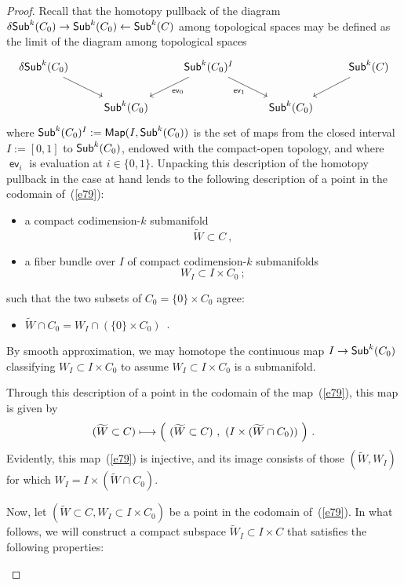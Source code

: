 \documentclass[10pt,a4paper]{amsart}
\DeclareMathOperator{\Map}{\sf Map}
\DeclareMathOperator{\Sub}{\sf Sub}
\DeclareMathOperator{\dSub}{\delta{\sf Sub}}
\DeclareMathOperator{\ev}{\mathsf{ev}}
\newcommand{\la}{\leftarrow}
\newcommand{\ra}{\rightarrow}
\newcommand{\w}{\widetilde}
\begin{document}
\begin{proof}
Recall that the homotopy pullback of the diagram $\dSub^k(C_0)\ra \Sub^k(C_0) \la \Sub^k(C)$ among topological spaces may be defined as the limit of the diagram among topological spaces
\[\begin{tikzcd}
	\dSub^k(C_0) && {\Sub^k(C_0)^I} && \Sub^k(C) \\
	& \Sub^k(C_0) && \Sub^k(C_0)
	\arrow[""', from=1-1, to=2-2]
	\arrow["{\ev_0}", from=1-3, to=2-2]
	\arrow["{\ev_1}"', from=1-3, to=2-4]
	\arrow["", from=1-5, to=2-4]
\end{tikzcd}\]
where $\Sub^k(C_0)^I := \Map(I,\Sub^k(C_0))$ is the set of maps from the closed interval $I := [0,1]$ to $\Sub^k(C_0)$, endowed with the compact-open topology, and where $\ev_i$ is evaluation at $i\in \{0,1\}$.
Unpacking this description of the homotopy pullback in the case at hand lends to the following description of a point in the codomain of~(\ref{e79}):
\begin{itemize}
    \item[+] a compact codimension-$k$ submanifold
    \[
    \w{W} \subset C
    ~,
    \]
    
    \item[+] a fiber bundle over $I$ of compact codimension-$k$ submanifolds 
    \[
    W_I \subset I \times C_0
    ~;
    \]

    
\end{itemize}
such that the two subsets of $C_0 = \{0\} \times C_0$ agree:
\begin{itemize}
    \item[-] $\w{W} \cap C_0 = W_I \cap (\{0\} \times C_0)$~.
\end{itemize}
By smooth approximation, we may homotope the continuous map $I \to \Sub^k(C_0)$ classifying $W_I \subset I \times C_0$ to assume $W_I \subset I \times C_0$ is a submanifold.  

Through this description of a point in the codomain of the map~(\ref{e79}), this map is given by 
\[
(\w{W} \subset C)
\longmapsto 
\Bigl( ~(\w{W} \subset C)~,~(I \times (\w{W} \cap C_0))~ \Bigr)
~.
\]
Evidently, this map~(\ref{e79}) is injective, and its image consists of those $(\w{W},W_I)$ for which $W_I = I \times (\w{W} \cap C_0)$.



Now, let $(\w{W} \subset C , W_I \subset I \times C_0)$ be a point in the codomain of~(\ref{e79}).
In what follows, we will construct a compact subspace $\w{W}_I \subset I \times C$ that satisfies the following properties:
\begin{enumerate}


\end{enumerate}
\end{proof}
\end{document}
